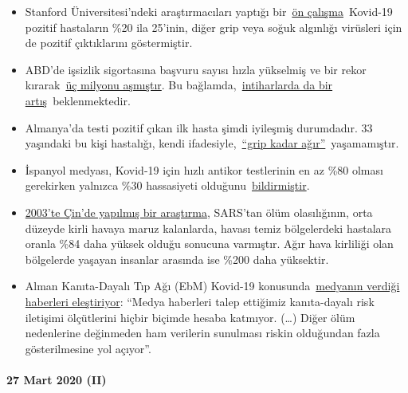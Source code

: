 \begin{itemize}
\tightlist
\item
  Stanford Üniversitesi'ndeki araştırmacıları yaptığı
  bir~\href{https://medium.com/@nigam/higher-co-infection-rates-in-covid19-b24965088333}{ön
  çalışma}~Kovid-19 pozitif hastaların \%20 ila 25'inin, diğer grip veya
  soğuk algınlığı virüsleri için de pozitif çıktıklarını göstermiştir.
\item
  ABD'de işsizlik sigortasına başvuru sayısı hızla yükselmiş ve bir
  rekor
  kırarak~\href{https://www.businessinsider.com/us-weekly-jobless-claims-record-coronavirus-unemployment-insurance-labor-recession-2020-3}{üç
  milyonu aşmıştır}. Bu
  bağlamda,~\href{https://twitter.com/KoenSwinkels/status/1243066532390977544}{intiharlarda
  da bir artış}~beklenmektedir.
\item
  Almanya'da testi pozitif çıkan ilk hasta şimdi iyileşmiş durumdadır.
  33 yaşındaki bu kişi hastalığı, kendi
  ifadesiyle,~\href{https://www.br.de/nachrichten/bayern/coronavirus-patient-nummer-1-wie-ich-die-quarantaene-erlebte,Rrm4Ul8}{``grip
  kadar ağır''}~yaşamamıştır.
\item
  İspanyol medyası, Kovid-19 için hızlı antikor testlerinin en az \%80
  olması gerekirken yalnızca \%30 hassasiyeti
  olduğunu~\href{https://elpais.com/sociedad/2020-03-25/los-test-rapidos-de-coronavirus-comprados-en-china-no-funcionan.html}{bildirmiştir}.
\item
  \href{https://ehjournal.biomedcentral.com/articles/10.1186/1476-069X-2-15}{2003'te
  Çin'de yapılmış bir araştırma}, SARS'tan ölüm olasılığının, orta
  düzeyde kirli havaya maruz kalanlarda, havası temiz bölgelerdeki
  hastalara oranla \%84 daha yüksek olduğu sonucuna varmıştır. Ağır hava
  kirliliği olan bölgelerde yaşayan insanlar arasında ise \%200 daha
  yüksektir.
\item
  Alman Kanıta-Dayalı Tıp Ağı (EbM) Kovid-19
  konusunda~\href{https://www.ebm-netzwerk.de/en/publications/covid-19}{medyanın
  verdiği haberleri eleştiriyor}: ``Medya haberleri talep ettiğimiz
  kanıta-dayalı risk iletişimi ölçütlerini hiçbir biçimde hesaba
  katmıyor. (\ldots{}) Diğer ölüm nedenlerine değinmeden ham verilerin
  sunulması riskin olduğundan fazla gösterilmesine yol açıyor''.
\end{itemize}

\hypertarget{27-mart-2020-ii}{%
\paragraph{27 Mart 2020 (II)}\label{27-mart-2020-ii}}

